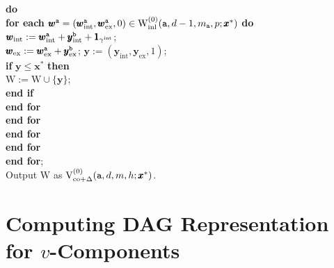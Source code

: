 \documentclass[12pt]{article}
\newcommand{\intt}{\mathrm{int}}
\newcommand{\ex}{\mathrm{ex}}
\newcommand{\co}{\mathrm{co}}
\newcommand{\V}{{\rm V}}
\newcommand{\ta}{{\tt a}}
\newcommand{\tb}{{\tt b}}
\newcommand{\w}{\pmb{w}}
\newcommand{\y}{\pmb{y}}
\newcommand{\x}{\pmb{x}}
\newcommand{\1}{\pmb{1}}
\newcommand{\0}{\pmb{0}}
\newcommand{\inl}{\mathrm{inl}}
\newcommand{\W}{\mathrm{W}}
\begin{document}
\begin{tabbing}
                       {\bf do} \+ \\
                      {\bf for each} $\w^{\ta} = (\w^{\ta}_{\intt}, \w^{\ta}_{\ex}, 0) \in 
                      \W_{\inl}^{(0)}(\ta, d-1,m_{\ta}, p; \x^*)$ 
                      {\bf do} \+\\                      
                     $\w_{\intt} := \w^{\ta}_{\intt} + \y^{\tb}_{\intt} + \1_{\gamma^{\intt}}$;  \\
                     $\w_{\ex} := \w^{\ta}_{\ex} + \y^{\tb}_{\ex}$;  
                     $\y:=(\y_{\intt}, \y_{\ex}, 1)$;\\
{\bf if } $\y \leq \x^*$ {\bf then} \+ \\  
                                          $\W := \W \cup \{ \y \}$; \- \\              
                      {\bf end if} \- \\
                 {\bf end for} \- \\
            {\bf end for} \- \\
        {\bf end for} \-\\
    {\bf end for} \-\\
{\bf end for};  \\
Output $\W$ as $\V_{\co + \Delta}^{(0)}(\ta, d, m, h; \x^*)$.
\end{tabbing}


% 
% 
\section{Computing DAG Representation for $v$-Components}
\end{document}
